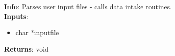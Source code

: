 \textbf{Info}: Parses user input files - calls data intake routines.\\

\noindent \textbf{Inputs}:
\begin{itemize}
\item{char *inputfile}
\end{itemize}

\noindent \textbf{Returns}: void
